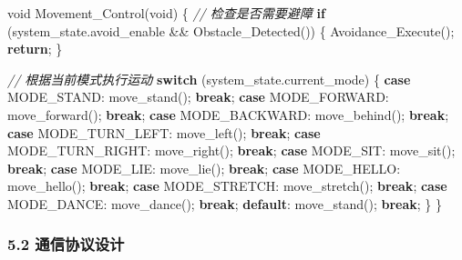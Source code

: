 \documentclass[
]{article}
\newenvironment{Shaded}{}{}
\newcommand{\CommentTok}[1]{\textcolor[rgb]{0.38,0.63,0.69}{\textit{#1}}}
\newcommand{\ControlFlowTok}[1]{\textcolor[rgb]{0.00,0.44,0.13}{\textbf{#1}}}
\newcommand{\DataTypeTok}[1]{\textcolor[rgb]{0.56,0.13,0.00}{#1}}
\newcommand{\NormalTok}[1]{#1}
\begin{document}
\begin{Shaded}
\begin{Highlighting}[]
\DataTypeTok{void}\NormalTok{ Movement\_Control(}\DataTypeTok{void}\NormalTok{)}
\NormalTok{\{}
    \CommentTok{// 检查是否需要避障}
    \ControlFlowTok{if}\NormalTok{ (system\_state.avoid\_enable \&\& Obstacle\_Detected()) \{}
\NormalTok{        Avoidance\_Execute();}
        \ControlFlowTok{return}\NormalTok{;}
\NormalTok{    \}}
    
    \CommentTok{// 根据当前模式执行运动}
    \ControlFlowTok{switch}\NormalTok{ (system\_state.current\_mode) \{}
        \ControlFlowTok{case}\NormalTok{ MODE\_STAND:}
\NormalTok{            move\_stand();}
            \ControlFlowTok{break}\NormalTok{;}
        \ControlFlowTok{case}\NormalTok{ MODE\_FORWARD:}
\NormalTok{            move\_forward();}
            \ControlFlowTok{break}\NormalTok{;}
        \ControlFlowTok{case}\NormalTok{ MODE\_BACKWARD:}
\NormalTok{            move\_behind();}
            \ControlFlowTok{break}\NormalTok{;}
        \ControlFlowTok{case}\NormalTok{ MODE\_TURN\_LEFT:}
\NormalTok{            move\_left();}
            \ControlFlowTok{break}\NormalTok{;}
        \ControlFlowTok{case}\NormalTok{ MODE\_TURN\_RIGHT:}
\NormalTok{            move\_right();}
            \ControlFlowTok{break}\NormalTok{;}
        \ControlFlowTok{case}\NormalTok{ MODE\_SIT:}
\NormalTok{            move\_sit();}
            \ControlFlowTok{break}\NormalTok{;}
        \ControlFlowTok{case}\NormalTok{ MODE\_LIE:}
\NormalTok{            move\_lie();}
            \ControlFlowTok{break}\NormalTok{;}
        \ControlFlowTok{case}\NormalTok{ MODE\_HELLO:}
\NormalTok{            move\_hello();}
            \ControlFlowTok{break}\NormalTok{;}
        \ControlFlowTok{case}\NormalTok{ MODE\_STRETCH:}
\NormalTok{            move\_stretch();}
            \ControlFlowTok{break}\NormalTok{;}
        \ControlFlowTok{case}\NormalTok{ MODE\_DANCE:}
\NormalTok{            move\_dance();}
            \ControlFlowTok{break}\NormalTok{;}
        \ControlFlowTok{default}\NormalTok{:}
\NormalTok{            move\_stand();}
            \ControlFlowTok{break}\NormalTok{;}
\NormalTok{    \}}
\NormalTok{\}}
\end{Highlighting}
\end{Shaded}

\hypertarget{ux901aux4fe1ux534fux8baeux8bbeux8ba1}{%
\subsubsection{5.2
通信协议设计}\label{ux901aux4fe1ux534fux8baeux8bbeux8ba1}}
\end{document}
